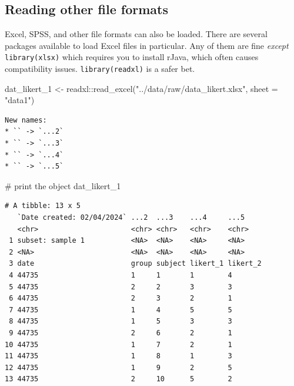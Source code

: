 \documentclass[
  letterpaper,
  DIV=11,
  numbers=noendperiod]{scrreprt}
\newenvironment{Shaded}{\begin{snugshade}}{\end{snugshade}}
\newcommand{\AttributeTok}[1]{\textcolor[rgb]{0.40,0.45,0.13}{#1}}
\newcommand{\CommentTok}[1]{\textcolor[rgb]{0.37,0.37,0.37}{#1}}
\newcommand{\FunctionTok}[1]{\textcolor[rgb]{0.28,0.35,0.67}{#1}}
\newcommand{\NormalTok}[1]{\textcolor[rgb]{0.00,0.23,0.31}{#1}}
\newcommand{\OtherTok}[1]{\textcolor[rgb]{0.00,0.23,0.31}{#1}}
\newcommand{\SpecialCharTok}[1]{\textcolor[rgb]{0.37,0.37,0.37}{#1}}
\newcommand{\StringTok}[1]{\textcolor[rgb]{0.13,0.47,0.30}{#1}}
\begin{document}
\subsection{Reading other file
formats}\label{reading-other-file-formats}

Excel, SPSS, and other file formats can also be loaded. There are
several packages available to load Excel files in particular. Any of
them are fine \emph{except} \texttt{library(xlsx)} which requires you to
install rJava, which often causes compatibility issues.
\texttt{library(readxl)} is a safer bet.

\begin{Shaded}
\begin{Highlighting}[]
\NormalTok{dat\_likert\_1 }\OtherTok{\textless{}{-}}\NormalTok{ readxl}\SpecialCharTok{::}\FunctionTok{read\_excel}\NormalTok{(}\StringTok{"../data/raw/data\_likert.xlsx"}\NormalTok{, }\AttributeTok{sheet =} \StringTok{"data1"}\NormalTok{)}
\end{Highlighting}
\end{Shaded}

\begin{verbatim}
New names:
* `` -> `...2`
* `` -> `...3`
* `` -> `...4`
* `` -> `...5`
\end{verbatim}

\begin{Shaded}
\begin{Highlighting}[]
\CommentTok{\# print the object}
\NormalTok{dat\_likert\_1}
\end{Highlighting}
\end{Shaded}

\begin{verbatim}
# A tibble: 13 x 5
   `Date created: 02/04/2024` ...2  ...3    ...4     ...5    
   <chr>                      <chr> <chr>   <chr>    <chr>   
 1 subset: sample 1           <NA>  <NA>    <NA>     <NA>    
 2 <NA>                       <NA>  <NA>    <NA>     <NA>    
 3 date                       group subject likert_1 likert_2
 4 44735                      1     1       1        4       
 5 44735                      2     2       3        3       
 6 44735                      2     3       2        1       
 7 44735                      1     4       5        5       
 8 44735                      1     5       3        3       
 9 44735                      2     6       2        1       
10 44735                      1     7       2        1       
11 44735                      1     8       1        3       
12 44735                      1     9       2        5       
13 44735                      2     10      5        2       
\end{verbatim}
\end{document}
